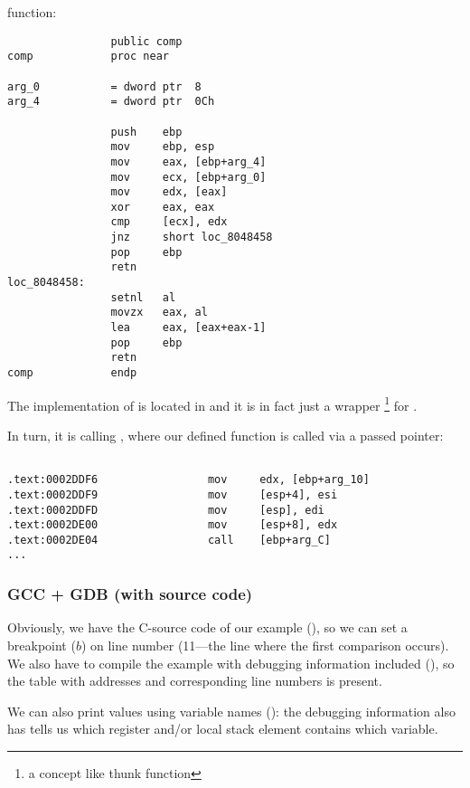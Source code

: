 \comp function:

\begin{lstlisting}
                public comp
comp            proc near

arg_0           = dword ptr  8
arg_4           = dword ptr  0Ch

                push    ebp
                mov     ebp, esp
                mov     eax, [ebp+arg_4]
                mov     ecx, [ebp+arg_0]
                mov     edx, [eax]
                xor     eax, eax
                cmp     [ecx], edx
                jnz     short loc_8048458
                pop     ebp
                retn
loc_8048458:
                setnl   al
                movzx   eax, al
                lea     eax, [eax+eax-1]
                pop     ebp
                retn
comp            endp
\end{lstlisting}


The implementation of \qsort is located in  and it is in fact just a wrapper
\footnote{a concept like \gls{thunk function}} for .

In turn, it is calling , where our defined function is called via a passed pointer:

\begin{lstlisting}[caption=(file libc.so.6{,} glibc version---2.10.1)]

.text:0002DDF6                 mov     edx, [ebp+arg_10]
.text:0002DDF9                 mov     [esp+4], esi
.text:0002DDFD                 mov     [esp], edi
.text:0002DE00                 mov     [esp+8], edx
.text:0002DE04                 call    [ebp+arg_C]
...
\end{lstlisting}

\subsubsection{GCC + GDB (with source code)}

Obviously, we have the C-source code of our example (), 
so we can set a breakpoint ($b$) on line number (11---the line where the first comparison occurs).
We also have to compile the example with debugging information included (), so the table
with addresses and corresponding line numbers is present.

We can also print values using variable names ():
the debugging information also has tells us which register and/or 
local stack element contains which variable.

